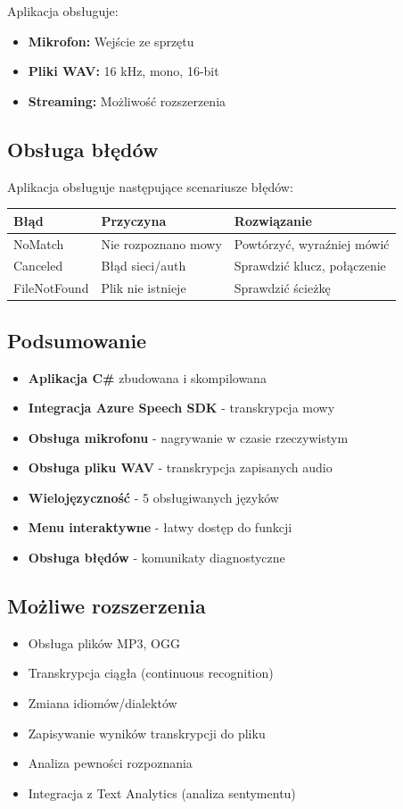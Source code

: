 Aplikacja obsługuje:
\begin{itemize}
	\item \textbf{Mikrofon:} Wejście ze sprzętu
	\item \textbf{Pliki WAV:} 16 kHz, mono, 16-bit
	\item \textbf{Streaming:} Możliwość rozszerzenia
\end{itemize}

\subsection{Obsługa błędów}

Aplikacja obsługuje następujące scenariusze błędów:

\begin{center}
	\begin{tabular}{|l|l|l|}
		\hline
		\textbf{Błąd} & \textbf{Przyczyna} & \textbf{Rozwiązanie} \\
		\hline
		NoMatch & Nie rozpoznano mowy & Powtórzyć, wyraźniej mówić \\
		Canceled & Błąd sieci/auth & Sprawdzić klucz, połączenie \\
		FileNotFound & Plik nie istnieje & Sprawdzić ścieżkę \\
		\hline
	\end{tabular}
\end{center}

\subsection{Podsumowanie}

\begin{itemize}
	\item \textbf{Aplikacja C\#} zbudowana i skompilowana
	\item \textbf{Integracja Azure Speech SDK} - transkrypcja mowy
	\item \textbf{Obsługa mikrofonu} - nagrywanie w czasie rzeczywistym
	\item \textbf{Obsługa pliku WAV} - transkrypcja zapisanych audio
	\item \textbf{Wielojęzyczność} - 5 obsługiwanych języków
	\item \textbf{Menu interaktywne} - łatwy dostęp do funkcji
	\item \textbf{Obsługa błędów} - komunikaty diagnostyczne
\end{itemize}

\subsection{Możliwe rozszerzenia}

\begin{itemize}
	\item Obsługa plików MP3, OGG
	\item Transkrypcja ciągła (continuous recognition)
	\item Zmiana idiomów/dialektów
	\item Zapisywanie wyników transkrypcji do pliku
	\item Analiza pewności rozpoznania
	\item Integracja z Text Analytics (analiza sentymentu)
\end{itemize}
